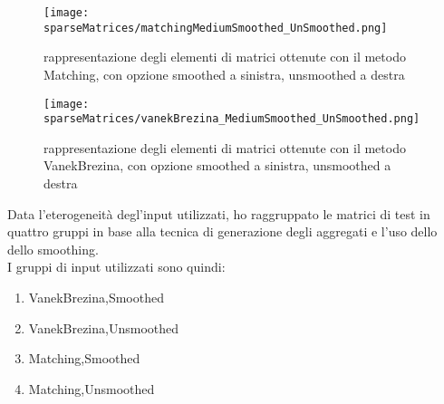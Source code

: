 \begin{figure}[H]
  \centering \texttt{[image: sparseMatrices/matchingMediumSmoothed\_UnSmoothed.png]}
  \caption[pattern dei non zeri nelle matrici Matching]
  {rappresentazione degli elementi \nnz di matrici ottenute con il metodo Matching, con opzione smoothed a sinistra, unsmoothed a destra}
  \decoRule \label{fig:sparseMatrix}
\end{figure}
\begin{figure}[H]
  \centering \texttt{[image: sparseMatrices/vanekBrezina\_MediumSmoothed\_UnSmoothed.png]}
  \caption[pattern dei non zeri nelle matrici VanekBrezina]
  {rappresentazione degli elementi \nnz di matrici ottenute con il metodo VanekBrezina, con opzione smoothed a sinistra, unsmoothed a destra}
  \decoRule \label{fig:sparseMatrix1}
\end{figure}
\label{inputClasses}
Data l'eterogeneità degl'input utilizzati, 
ho raggruppato le matrici di test in quattro gruppi in base alla tecnica di generazione degli aggregati %
e l'uso dello dello smoothing.\\
I gruppi di input utilizzati sono quindi: 
\begin{enumerate}
	\item VanekBrezina,Smoothed
	\item VanekBrezina,Unsmoothed
	\item Matching,Smoothed
	\item Matching,Unsmoothed
\end{enumerate}

